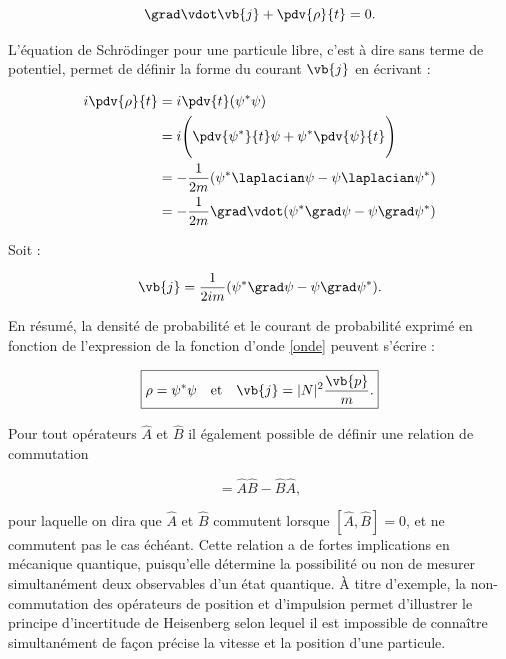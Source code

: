         \begin{equation}
            \grad\vdot\vb{j}+\pdv{\rho}{t}=0.
        \end{equation}

        L'équation de Schrödinger pour une particule libre, c'est à dire sans terme de potentiel, permet de définir la forme du courant $\vb{j}$ en écrivant :

        \begin{equation*}
        \begin{split}
        i\pdv{\rho}{t} & =i\pdv{t}(\large\psi^*\psi) \\
         & = i\Biggl(\pdv{\psi^*}{t}\psi + \psi^*\pdv{\psi}{t}\Biggr) \\
         & = -\frac{1}{2m}(\psi^*\laplacian\psi-\psi\laplacian\psi^*) \\
         & = -\frac{1}{2m}\grad\vdot(\psi^*\grad\psi-\psi\grad\psi^*) \\
        \end{split}
        \end{equation*}

        Soit :

        \begin{equation*}
            \vb{j} = \frac{1}{2im}(\psi^*\grad\psi-\psi\grad\psi^*). \\
        \end{equation*}

        En résumé, la densité de probabilité et le courant de probabilité exprimé en fonction de l'expression de la fonction d'onde \ref{onde} peuvent s'écrire :

        \begin{equation}
            \boxed{
            \rho=\psi^*\psi \quad \mbox{et} \quad \vb{j}=|N|^2\frac{\vb{p}}{m}.
            }
        \end{equation}
        
        Pour tout opérateurs $\hat{A}$ et $\hat{B}$ il également possible de définir une relation de commutation 
        
        \begin{equation}
            [\hat{A},\hat{B}]=\hat{A}\hat{B}-\hat{B}\hat{A},
        \end{equation}
        
        pour laquelle on dira que $\hat{A}$ et $\hat{B}$ commutent lorsque $[\hat{A},\hat{B}]=0$, et ne commutent pas le cas échéant. Cette relation a de fortes implications en mécanique quantique, puisqu'elle détermine la possibilité ou non de mesurer simultanément deux observables d'un état quantique. À titre d'exemple, la non-commutation des opérateurs de position et d'impulsion permet d'illustrer le principe d'incertitude de Heisenberg selon lequel il est impossible de connaître simultanément de façon précise la vitesse et la position d'une particule. 
    
